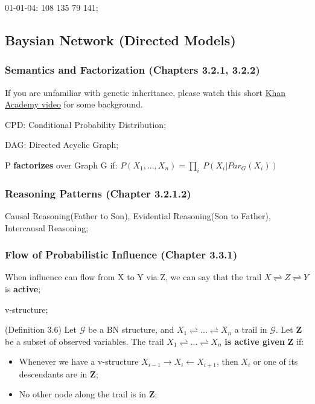 \documentclass[12pt]{article}
\numberwithin{equation}{section}
\begin{document}
01-01-04: 108 135 79 141;

\subsection{Baysian Network (Directed Models)}
\subsubsection{Semantics and Factorization (Chapters 3.2.1, 3.2.2)}
If you are unfamiliar with genetic inheritance, please watch this short \href{https://www.khanacademy.org/science/biology/classical-genetics/mendelian--genetics/v/introduction-to-heredity}{Khan Academy video} for some background.

CPD: Conditional Probability Distribution;

DAG: Directed Acyclic Graph;

P \textbf{factorizes} over Graph G if:
$P(X_1,...,X_n)=\prod_i\ P(X_i|Par_G(X_i))$
\subsubsection{Reasoning Patterns (Chapter 3.2.1.2)}
Causal Reasoning(Father to Son), Evidential Reasoning(Son to Father), Intercausal Reasoning;
\subsubsection{Flow of Probabilistic Influence (Chapter 3.3.1)}
When influence can flow from X to Y via Z, we can say that the trail $X \rightleftharpoons Z \rightleftharpoons Y$ is \textbf{active};

v-structure;

(Definition 3.6) Let $\mathcal{G}$ be a BN structure, and $X_1 \rightleftharpoons ... \rightleftharpoons X_n$ a trail in $\mathcal{G}$. Let $\mathbf{Z}$ be a subset of observed variables. The trail $X_1 \rightleftharpoons ... \rightleftharpoons X_n$ \textbf{is active given} $\mathbf{Z}$ if:
\begin{itemize}
	\item Whenever we have a v-structure $X_{i-1} \rightarrow X_i \leftarrow X_{i+1}$, then $X_i$ or one of its descendants are in $\mathbf{Z}$;
	\item No other node along the trail is in $\mathbf{Z}$;
\end{itemize}
\end{document}
